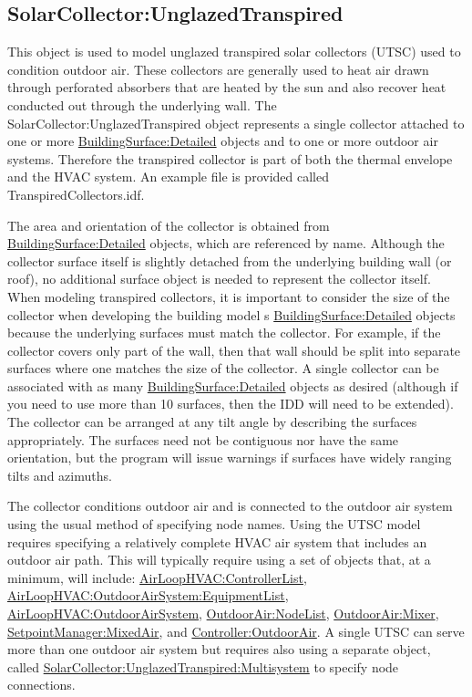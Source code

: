 \subsection{SolarCollector:UnglazedTranspired}\label{solarcollectorunglazedtranspired}

This object is used to model unglazed transpired solar collectors (UTSC) used to condition outdoor air. These collectors are generally used to heat air drawn through perforated absorbers that are heated by the sun and also recover heat conducted out through the underlying wall. The SolarCollector:UnglazedTranspired object represents a single collector attached to one or more \hyperref[buildingsurfacedetailed]{BuildingSurface:Detailed} objects and to one or more outdoor air systems. Therefore the transpired collector is part of both the thermal envelope and the HVAC system. An example file is provided called TranspiredCollectors.idf.

The area and orientation of the collector is obtained from \hyperref[buildingsurfacedetailed]{BuildingSurface:Detailed} objects, which are referenced by name. Although the collector surface itself is slightly detached from the underlying building wall (or roof), no additional surface object is needed to represent the collector itself. When modeling transpired collectors, it is important to consider the size of the collector when developing the building model s \hyperref[buildingsurfacedetailed]{BuildingSurface:Detailed} objects because the underlying surfaces must match the collector. For example, if the collector covers only part of the wall, then that wall should be split into separate surfaces where one matches the size of the collector. A single collector can be associated with as many \hyperref[buildingsurfacedetailed]{BuildingSurface:Detailed} objects as desired (although if you need to use more than 10 surfaces, then the IDD will need to be extended). The collector can be arranged at any tilt angle by describing the surfaces appropriately. The surfaces need not be contiguous nor have the same orientation, but the program will issue warnings if surfaces have widely ranging tilts and azimuths.

The collector conditions outdoor air and is connected to the outdoor air system using the usual method of specifying node names. Using the UTSC model requires specifying a relatively complete HVAC air system that includes an outdoor air path. This will typically require using a set of objects that, at a minimum, will include: \hyperref[airloophvaccontrollerlist]{AirLoopHVAC:ControllerList}, \hyperref[airloophvacoutdoorairsystemequipmentlist]{AirLoopHVAC:OutdoorAirSystem:EquipmentList}, \hyperref[airloophvacoutdoorairsystem]{AirLoopHVAC:OutdoorAirSystem}, \hyperref[outdoorairnodelist]{OutdoorAir:NodeList}, \hyperref[outdoorairmixer]{OutdoorAir:Mixer}, \hyperref[setpointmanagermixedair]{SetpointManager:MixedAir}, and \hyperref[controlleroutdoorair]{Controller:OutdoorAir}. A single UTSC can serve more than one outdoor air system but requires also using a separate object, called \hyperref[solarcollectorunglazedtranspiredmultisystem]{SolarCollector:UnglazedTranspired:Multisystem} to specify node connections.


